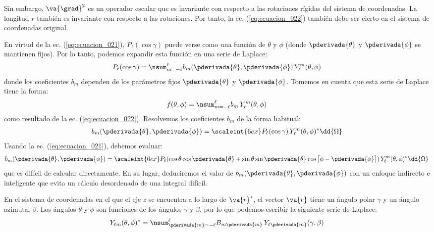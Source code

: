 Sin embargo, $\va{\grad}^{2}$ es un operador escalar que es invariante con respecto a las rotaciones rígidas del sistema de coordenadas. La longitud $r$ también es invariante con respecto a las rotaciones. Por tanto, la ec. (\ref{eq:ecuacion_022}) también debe ser cierto en el sistema de coordenadas original.
\par
En virtud de la ec. (\ref{eq:ecuacion_021}), $P_{\ell} (\cos \gamma)$ puede verse como una función de $\theta$ y $\phi$ (donde $\pderivada{\theta}$ y $\pderivada{\phi}$ se mantienen fijos). Por lo tanto, podemos expandir esta función en una serie de Laplace:
\begin{align}
P_{\ell} (\cos \gamma) = \nsum_{m=-\ell}^{\ell} b_{m} (\pderivada{\theta}, \pderivada{\phi}) \, Y_{\ell}^{m} (\theta, \phi)
\label{eq:ecuacion_023}
\end{align}
donde los coeficientes $b_{m}$ dependen de los parámetros fijos $\pderivada{\theta}$ y $\pderivada{\phi}$. Tomemos en cuenta que esta serie de Laplace tiene la forma:
\begin{align}
f(\theta, \phi) = \nsum_{m=-\ell}^{\ell} b_{m} \, Y_{\ell}^{m} (\theta, \phi)
\label{eq:ecuacion_019}
\end{align}
como resultado de la ec. (\ref{eq:ecuacion_022}). Resolvemos los coeficientes $b_{m}$ de la forma habitual:
\begin{align}
b_{m} (\pderivada{\theta}, \pderivada{\phi}) = \scaleint{6ex} P_{\ell} (\cos \gamma) \, Y_{\ell}^{m} (\theta, \phi)^{*} \dd{\Omega}
\end{align}
Usando la ec. (\ref{eq:ecuacion_021}), debemos evaluar:
\begin{align}
b_{m} (\pderivada{\theta}, \pderivada{\phi}) = \scaleint{6ex} P_{\ell} (\cos \theta \cos \pderivada{\theta} + \sin \theta \sin \pderivada{\theta} \cos \big[ \phi - \pderivada{\phi} \big]) \, Y_{\ell}^{m} (\theta, \phi)^{*} \dd{\Omega}
\label{eq:ecuacion_024}
\end{align}
que es difícil de calcular directamente. En su lugar, deduciremos el valor de $b_{m} (\pderivada{\theta}, \pderivada{\phi})$ con un enfoque indirecto e inteligente que evita un cálculo desordenado de una integral difícil.
\par
En el sistema de coordenadas en el que el eje $z$ se encuentra a lo largo de $\va{r}^{\, \prime}$, el vector $\va{r}$ tiene un ángulo polar $\gamma$ y un ángulo azimutal $\beta$. Los ángulos $\theta$ y $\phi$ son funciones de los ángulos $\gamma$ y $\beta$, por lo que podemos escribir la siguiente serie de Laplace:
\begin{align}
Y_{\ell m} (\theta, \phi)^{*} = \nsum_{\pderivada{m}=-\ell}^{\ell} B_{m \pderivada{m}} \, Y_{\ell \pderivada{m}} (\gamma, \beta)
\label{eq:ecuacion_025}
\end{align}

